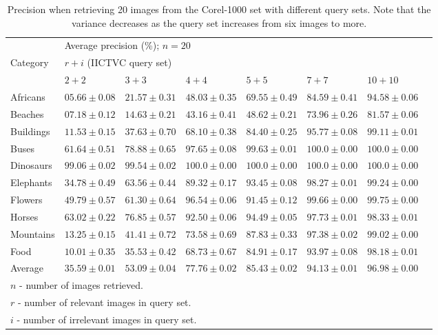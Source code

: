 \begin{table}	
\centering
\begin{scriptsize}
\begin{tabular}{l l l l l l l l}		
\hline					
 					 		& \multicolumn{6}{l}{Average precision (\%); $n=20$} \\ 
\cline{2-7}
Category 			 		&   \multicolumn{6}{l}{$r+i$ (IICTVC query set)} \\
 							& 	$2+2$  			&	$3+3$  			&	$4+4$  			&	$5+5$  			&	$7+7$  			&	$10+10$	\\ 
\hline
Africans		 			&	$05.66\pm0.08 $ &	$21.57\pm0.31 $ &	$48.03\pm0.35 $ &	$69.55\pm0.49 $ &	$84.59\pm0.41 $ &	$94.58\pm0.06 $	\\
Beaches 					&	$07.18\pm0.12 $ &	$14.63\pm0.21 $ &	$43.16\pm0.41 $ &	$48.62\pm0.21 $ &	$73.96\pm0.26 $ &	$81.57\pm0.06 $	\\
Buildings 					&	$11.53\pm0.15 $ &	$37.63\pm0.70 $ &	$68.10\pm0.38 $ &	$84.40\pm0.25 $ &	$95.77\pm0.08 $ &	$99.11\pm0.01 $	\\
Buses 					 	&	$61.64\pm0.51 $ &	$78.88\pm0.65 $ &	$97.65\pm0.08 $ &	$99.63\pm0.01 $ &	$100.0\pm0.00 $ &	$100.0\pm0.00 $	\\
Dinosaurs 					&	$99.06\pm0.02 $ &	$99.54\pm0.02 $ &	$100.0\pm0.00 $ &	$100.0\pm0.00 $ & 	$100.0\pm0.00 $ &	$100.0\pm0.00 $	\\
Elephants 					&	$34.78\pm0.49 $ &	$63.56\pm0.44 $ &	$89.32\pm0.17 $ &	$93.45\pm0.08 $ &	$98.27\pm0.01 $ &	$99.24\pm0.00 $	\\
Flowers 					&	$49.79\pm0.57 $ &	$61.30\pm0.64 $ &	$96.54\pm0.06 $ &	$91.45\pm0.12 $ &	$99.66\pm0.00 $ &	$99.75\pm0.00 $	\\
Horses 						&	$63.02\pm0.22 $ &	$76.85\pm0.57 $ &	$92.50\pm0.06 $ &	$94.49\pm0.05 $ &	$97.73\pm0.01 $ &	$98.33\pm0.01 $	\\
Mountains 					&	$13.25\pm0.15 $ &	$41.41\pm0.72 $ &	$73.58\pm0.69 $ &	$87.83\pm0.33 $ &	$97.38\pm0.02 $ &	$99.02\pm0.00 $	\\
Food 						&	$10.01\pm0.35 $ &	$35.53\pm0.42 $ &	$68.73\pm0.67 $ &	$84.91\pm0.17 $ &	$93.97\pm0.08 $ &	$98.18\pm0.01 $	\smallskip\\ 
Average						&	$35.59\pm0.01 $ &	$53.09\pm0.04 $ &	$77.76\pm0.02 $ &	$85.43\pm0.02 $  &	$94.13\pm0.01 $ &	$96.98\pm0.00 $ \\ 
\hline
\multicolumn{7}{l}{$n$ - number of images retrieved.}\\
\multicolumn{7}{l}{$r$ - number of relevant images in query set.}\\
\multicolumn{7}{l}{$i$ - number of irrelevant images in query set.}
\end{tabular}							
\end{scriptsize}
\caption{Precision when retrieving 20 images from the Corel-1000 set with different query sets. Note that the variance decreases as the query set increases from six images to more.}
\label{table:res:cbir:prec20}
\end{table}							
